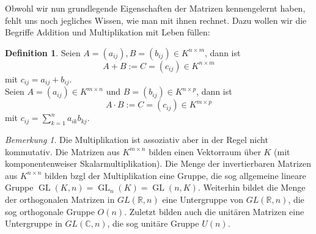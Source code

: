 \documentclass[fontsize=12pt,paper=a4,twoside,bibtotoc,idxtotoc,
liststotoc,pagesize,BCOR1.2cm,DIV15,chapterprefix,pagesize=pdftex]{scrbook}
\theoremstyle{plain}
\theoremstyle{definition}
\newtheorem{df}[equation]{Definition}
\theoremstyle{remark}
\newtheorem{bem}[equation]{Bemerkung}
\begin{document}
Obwohl wir nun grundlegende Eigenschaften der Matrizen kennengelernt haben, fehlt uns noch jegliches Wissen, wie man mit ihnen rechnet. Dazu wollen wir die Begriffe 
Addition und Multiplikation mit Leben füllen:
\begin{df}
Seien $A=(a_{ij}),B=(b_{ij}) \in {K}^{n \times m}$, dann ist 
\[ A+B:= C =(c_{ij})\in {K}^{n \times m} \]
mit $c_{ij}=a_{ij}+b_{ij}$.\\ 
Seien $A=(a_{ij}) \in {K}^{m \times n}$ und $B=(b_{ij})
\in {K}^{n \times p}$, dann ist 
\[ A \cdot B:= C =(c_{ij}) \in{K}^{m \times p} \]
mit $c_{ij}=\sum_{k=1}^n a_{ik} b_{kj}$.
\end{df}
\begin{bem}
Die Multiplikation ist assoziativ aber in der Regel nicht kommutativ. Die Matrizen aus $K^{m \times n}$ bilden einen Vektorraum über
$K$ (mit komponentenweiser Skalarmultiplikation). Die Menge der invertierbaren Matrizen aus $K^{n \times n}$ bilden bzgl der Multiplikation eine Gruppe, die sog 
allgemeine lineare Gruppe $\operatorname{GL}(K,n) = \operatorname{GL}_n(K) = \operatorname{GL}(n,K)$. Weiterhin bildet die Menge der orthogonalen Matrizen in 
$GL(\mathbb{R},n)$ eine Untergruppe von $GL(\mathbb{R},n)$, die sog orthogonale Gruppe $O(n)$. Zuletzt bilden auch die unitären Matrizen eine Untergruppe in 
$GL(\mathbb{C},n)$, die sog unitäre Gruppe $U(n)$.
\end{bem}
\end{document}
